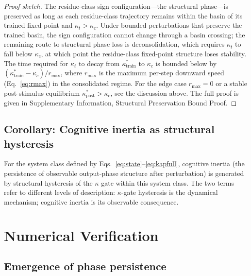 \begin{proof}[Proof sketch]
The residue-class sign configuration---the structural phase---is preserved as long as each residue-class trajectory remains within the basin of its trained fixed point and $\kappa_t > \kappa_c$. Under bounded perturbations that preserve the trained basin, the sign configuration cannot change through a basin crossing; the remaining route to structural phase loss is deconsolidation, which requires $\kappa_t$ to fall below $\kappa_c$, at which point the residue-class fixed-point structure loses stability. The time required for $\kappa_t$ to decay from $\kappa^*_{\mathrm{train}}$ to $\kappa_c$ is bounded below by $(\kappa^*_{\mathrm{train}} - \kappa_c)/r_{\max}$, where $r_{\max}$ is the maximum per-step downward speed (Eq.~\eqref{eq:rmax}) in the consolidated regime. For the edge case $r_{\max} = 0$ or a stable post-stimulus equilibrium $\kappa^*_{\mathrm{post}} > \kappa_c$, see the discussion above. The full proof is given in Supplementary Information, Structural Preservation Bound Proof.
\end{proof}

\subsection{Corollary: Cognitive inertia as structural hysteresis}

\begin{corollary}\label{cor:ci}
For the system class defined by Eqs.~\eqref{eq:state}--\eqref{eq:kapfull}, cognitive inertia (the persistence of observable output-phase structure after perturbation) is generated by structural hysteresis of the $\kappa$ gate within this system class. The two terms refer to different levels of description: $\kappa$-gate hysteresis is the dynamical mechanism; cognitive inertia is its observable consequence.
\end{corollary}

\section{Numerical Verification}

\subsection{Emergence of phase persistence}

